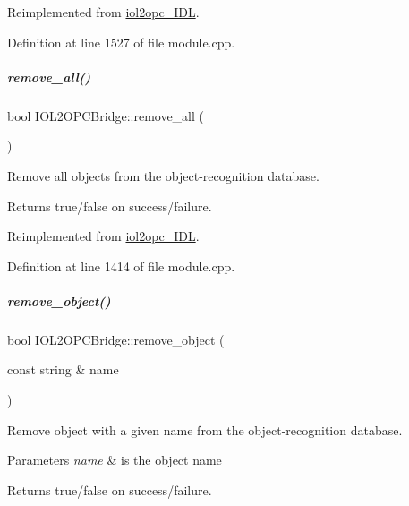 Reimplemented from \hyperlink{classiol2opc__IDL_a98bd49ef49a7600dc2d995dc165e73ce}{iol2opc\+\_\+\+I\+DL}.



Definition at line 1527 of file module.\+cpp.

\mbox{\label{group__iol2opc_abdb9a0e9a4edb15469cce67416ed6a2f}} 
\subparagraph{\texorpdfstring{remove\+\_\+all()}{remove\_all()}}
{\footnotesize\ttfamily bool I\+O\+L2\+O\+P\+C\+Bridge\+::remove\+\_\+all (\begin{DoxyParamCaption}{ }\end{DoxyParamCaption})\hspace{0.3cm}{\ttfamily [virtual]}}



Remove all objects from the object-\/recognition database. 

\begin{DoxyReturn}{Returns}
true/false on success/failure. 
\end{DoxyReturn}


Reimplemented from \hyperlink{classiol2opc__IDL_a1b773df105805332a143614903ae6370}{iol2opc\+\_\+\+I\+DL}.



Definition at line 1414 of file module.\+cpp.

\mbox{\label{group__iol2opc_aab19e8834838cce5da74d31f115b9fd5}} 
\subparagraph{\texorpdfstring{remove\+\_\+object()}{remove\_object()}}
{\footnotesize\ttfamily bool I\+O\+L2\+O\+P\+C\+Bridge\+::remove\+\_\+object (\begin{DoxyParamCaption}\item[{const string \&}]{name }\end{DoxyParamCaption})\hspace{0.3cm}{\ttfamily [virtual]}}



Remove object with a given name from the object-\/recognition database. 


\begin{DoxyParams}{Parameters}
{\em name} & is the object name \\
\hline
\end{DoxyParams}
\begin{DoxyReturn}{Returns}
true/false on success/failure. 
\end{DoxyReturn}


